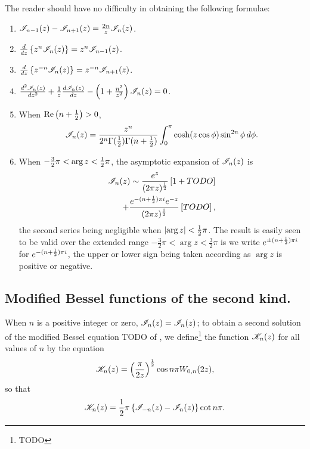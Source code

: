 \documentclass{book}
\begin{document}
  The reader should have no difficulty in obtaining the following
  formulae:
  \begin{enumerate}
    \item $\mathscr{I}_{n-1}(z) - \mathscr{I}_{n+1}(z) = \frac{2n}{z} \mathscr{I}_n(z)$.
    \item $\frac{d}{dz} \left\{ z^n \mathscr{I}_n(z) \right\} = z^n \mathscr{I}_{n-1}(z)$.
    \item $\frac{d}{dz} \left\{ z^{-n} \mathscr{I}_n(z) \right\} = z^{-n} \mathscr{I}_{n+1}(z)$.
    \item $\frac{d^2 \mathscr{I}_n(z)}{dz^2} + \frac{1}{z} \frac{d \mathscr{I}_n(z)}{dz} -
      \left( 1 + \frac{n^2}{z^2} \right) \mathscr{I}_n(z) = 0$.
    \item When $\mathrm{Re} \left( n + \frac{1}{2} \right) > 0$,
      $$
      \mathscr{I}_n(z)
      =
      \frac{z^n}{2^n \Gamma(\frac{1}{2}) \Gamma(n+\frac{1}{2})}
      \int_0^{\pi}
      \cosh (z\cos\phi) \sin^{2n} \phi \, d \phi.
      $$
    \item When $-\frac{3}{2}\pi < \arg z < \frac{1}{2} \pi$, the asymptotic
      expansion of $\mathscr{I}_n(z)$ is
      \begin{align*}
        \mathscr{I}_n(z)
        \sim
        \frac{ e^z}{ (2\pi z)^{\frac{1}{2}}}
        \left[ 1 + TODO \right]
        \\
        +
        \frac{ e^{-(n+\frac{1}{2}) \pi i} e^{-z}}{ (2\pi z)^{\frac{1}{2}} }
        \left[ TODO \right],
      \end{align*}
      the second series being negligible when $\left| \arg z \right| < \frac{1}{2}
      \pi$. The result is easily seen to be valid over the extended
      range $-\frac{3}{2} \pi < \arg z < \frac{3}{2} \pi$ is we write
      $e^{\pm (n+\frac{1}{2})\pi i}$ for $e^{-(n+\frac{1}{2})\pi i}$, the upper or
      lower sign being taken according as $\arg z$ is positive or negative.
    \end{enumerate}

    \subsection{Modified Bessel functions of the second kind.}
    When $n$ is a positive integer or zero, $\mathscr{I}_n(z) = \mathscr{I}_n(z)$;
    to obtain a second solution of the modified Bessel equation TODO
    of , we define\footnote{TODO} the function
    $\mathscr{K}_n(z)$ for all values of $n$ by the equation
    $$
    \mathscr{K}_n(z)
    =
    \left( \frac{\pi}{2z} \right)^{\frac{1}{2}}
    \cos n\pi
    W_{0,n}(2z),
    $$
    so that
    $$
    \mathscr{K}_n(z) = \frac{1}{2} \pi \left\{ \mathscr{I}_{-n}(z) - \mathscr{I}_n(z) \right\} \cot n\pi.
    $$
\end{document}
